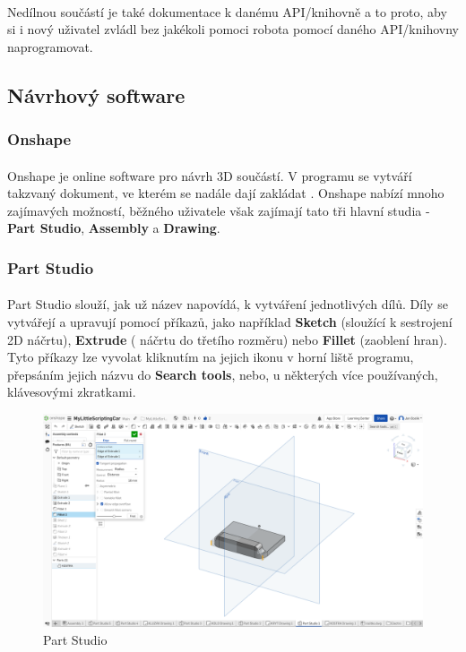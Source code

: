 \documentclass[12pt]{article}
\begin{document}
\begin{spacing}{1.5}
	\paragraph{} Nedílnou součástí je také dokumentace k danému API/knihovně a to proto, aby si i nový uživatel zvládl bez jakékoli pomoci robota pomocí daného API/knihovny naprogramovat.
	
	\newpage
	\subsection{Návrhový software}
	
	\subsubsection{Onshape}
	\paragraph{} Onshape je online software pro návrh 3D součástí. V programu se vytváří takzvaný dokument, ve kterém se nadále dají zakládat . Onshape nabízí mnoho zajímavých možností, běžného uživatele však zajímají tato tři hlavní studia - \textbf{Part Studio}, \textbf{Assembly} a \textbf{Drawing}.
	\subsubsection*{Part Studio}
	\paragraph{} Part Studio slouží, jak už název napovídá, k vytváření jednotlivých dílů. Díly se vytvářejí a upravují pomocí příkazů, jako například \textbf{Sketch} (sloužící k sestrojení 2D náčrtu), \textbf{Extrude} ( náčrtu do třetího rozměru) nebo \textbf{Fillet} (zaoblení hran). Tyto příkazy lze vyvolat kliknutím na jejich ikonu v horní liště programu, přepsáním jejich názvu do \textbf{Search tools}, nebo, u některých více používaných, klávesovými zkratkami.
	
	\begin{figure}[H]
		\centering
		\includegraphics[width=\linewidth]{part_studio}
		\caption{Part Studio}
		\label{fig:part_studio}
	\end{figure}
	

\end{spacing}
\end{document}
